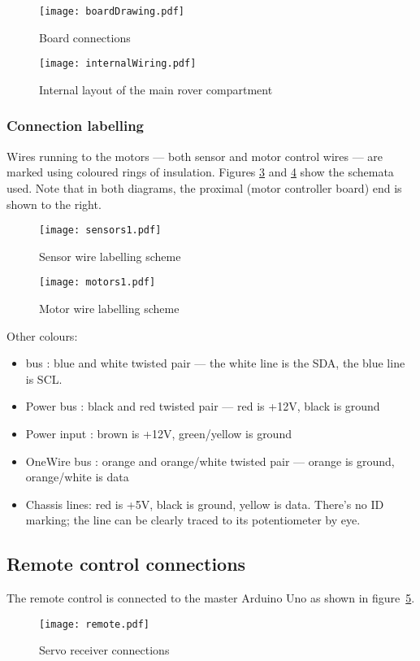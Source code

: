 \begin{figure}[ht]
\center
\texttt{[image: boardDrawing.pdf]}
\caption{Board connections}
\label{boardfig}
\end{figure}

\begin{figure}[ht]
\center
\texttt{[image: internalWiring.pdf]}
\caption{Internal layout of the main rover compartment}
\label{internalwiring}
\end{figure}

\clearpage
\subsubsection{Connection labelling}
Wires running to the motors --- both sensor and motor control wires ---
are marked using coloured rings of insulation.
Figures \ref{senscols} and \ref{motorcols} show the schemata used.
Note that in both diagrams, the proximal (motor controller board) end is shown to the
right.

\begin{figure}[ht]
\center
\texttt{[image: sensors1.pdf]}
\caption{Sensor wire labelling scheme}
\label{senscols}
\end{figure}


\begin{figure}[ht]
\center
\texttt{[image: motors1.pdf]}
\caption{Motor wire labelling scheme}
\label{motorcols}
\end{figure}

Other colours:
\begin{itemize}
\item \isqc{} bus : blue and white twisted pair --- the white line is the SDA, the
blue line is SCL.
\item Power bus : black and red twisted pair --- red is +12V, black is ground
\item Power input : brown is +12V, green/yellow is ground
\item OneWire bus : orange and orange/white twisted pair --- orange is ground,
orange/white is data
\item Chassis lines: red is +5V, black is ground, yellow is data. There's
no ID marking; the line can be clearly traced to its potentiometer by eye.
\end{itemize}
\clearpage
\subsection{Remote control connections}
The remote control is connected to the master Arduino Uno as shown in
figure~\ref{fig:remo}.
\begin{figure}[ht]
\center
\texttt{[image: remote.pdf]}
\caption{Servo receiver connections}
\label{fig:remo}
\end{figure}


